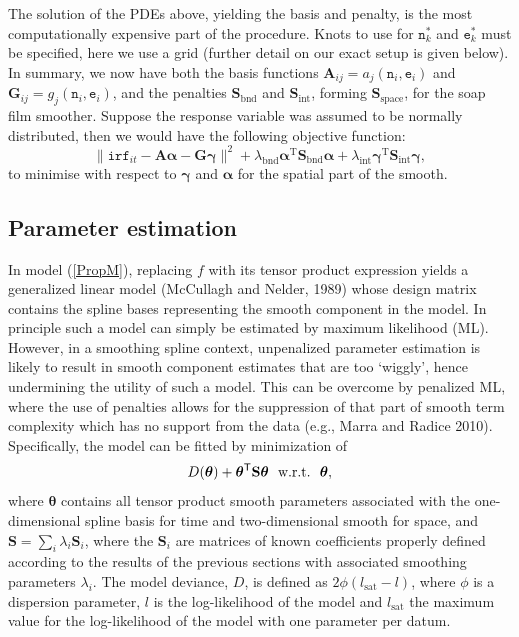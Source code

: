 \documentclass[10pt] {article}
\newcommand{\beq}{\begin{equation}}
\newcommand{\eeq}{\end{equation}}
\newcommand{\ts}{^{\sf T}}
\theoremstyle{definition}
\theoremstyle{plain}
\begin{document}
The solution of the PDEs above, yielding the basis and penalty, is the most computationally expensive part of the procedure. Knots to use for $\texttt{n}_k^*$ and $\texttt{e}_k^*$ must be specified, here we use a grid (further detail on our exact setup is given below). In summary, we now have both the basis functions $\textbf{A}_{ij}=a_j(\texttt{n}_i,\texttt{e}_i)$ and $\mathbf{G}_{ij}=g_j(\texttt{n}_i,\texttt{e}_i)$, and the penalties $\textbf{S}_\text{bnd}$ and $\textbf{S}_\text{int}$, forming $\textbf{S}_\text{space}$, for the soap film smoother. Suppose the response variable was assumed to be normally distributed, then we would have the following objective function:
\beq
\| \texttt{irf}_{it} -\textbf{A}\bm{\alpha}-\textbf{G}\bm{\gamma}\|^2 + \lambda_\text{bnd}\bm{\alpha}^\text{T}\textbf{S}_\text{bnd}\bm{\alpha}+ \lambda_\text{int}\bm{\gamma}^\text{T}\textbf{S}_\text{int}\bm{\gamma},
\eeq
to minimise with respect to $\bm{\gamma}$ and $\bm{\alpha}$ for the spatial part of the smooth.


\subsection{Parameter estimation \label{PE}}

In model (\ref{PropM}), replacing $f$ with its tensor product expression yields a generalized linear model (McCullagh and Nelder, 1989) whose design matrix contains the spline bases representing the smooth component in the model. In principle such a model can simply be estimated by maximum likelihood (ML). However, in a smoothing spline context, unpenalized parameter estimation is likely to result in smooth component estimates that are too `wiggly', hence undermining the utility of such a model. This can be overcome by penalized ML, where the use of penalties allows for the suppression of that part of smooth term complexity which has no support from the data (e.g., Marra and Radice 2010). Specifically, the model can be fitted by minimization of
\beq
D(\bm\theta) + \bm\theta\ts\textbf{S}\bm\theta \ \  \text{w.r.t.} \ \  \bm\theta,
\label{Dev}
\eeq
where $\bm\theta$ contains all tensor product smooth parameters associated with the one-dimensional spline basis for time and two-dimensional smooth for space, and $\textbf{S}=\sum_i \lambda_i \textbf{S}_i$, where the $\textbf{S}_i$ are matrices of known coefficients properly defined according to the results of the previous sections with associated smoothing parameters $\lambda_i$. The model deviance, $D$, is defined as $2\phi(l_{\text{sat}}-l)$, where $\phi$ is a dispersion parameter, $l$ is the log-likelihood of the model and $l_{\text{sat}}$ the maximum value for the log-likelihood of the model with one parameter per datum. 
\end{document}

